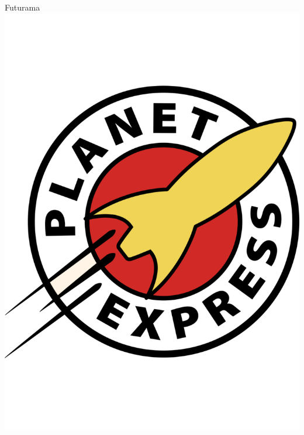 \begin{Mfigure}{Futurama}
 \centering
 \includegraphics[width=\linewidth]{Figure-C2.pdf}
 \caption[\figuretitle]
{\textbf{(A) Futurama.} Add as much text here as you want.}
\label{fig:c2}
\end{Mfigure}


